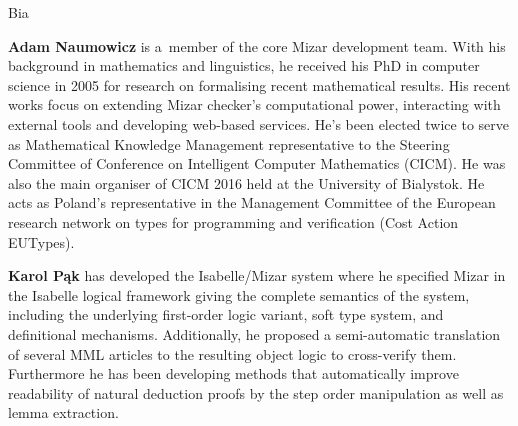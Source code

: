\begin{sitedescription}{Bia}
\begin{compactitem}
\item\textbf{Adam Naumowicz} is a~member of the core Mizar development team. 
With his background in mathematics and linguistics, he received his PhD in computer science in 2005
for research on formalising recent mathematical results. His recent works focus on extending Mizar checker's computational power, 
interacting with external tools and developing web-based services. 
He's been elected twice to serve as Mathematical Knowledge Management representative to the Steering Committee
of Conference on Intelligent Computer Mathematics (CICM).
He was also the main organiser of CICM 2016 held at the University of Bialystok. 
He acts as Poland's representative in the Management Committee of the European research network on types
 for programming and verification (Cost Action EUTypes).

\item\textbf{Karol Pąk} has developed the Isabelle/Mizar system where
he specified Mizar in the Isabelle logical framework
giving the complete semantics of the system, including
the underlying first-order logic variant, soft type system, and definitional mechanisms.
Additionally, he proposed a semi-automatic translation of several MML articles
to the resulting object logic to cross-verify them.
Furthermore he has been developing methods
that automatically improve readability of natural deduction proofs
by the step order manipulation as well as lemma extraction.

\end{compactitem}

\end{sitedescription}


